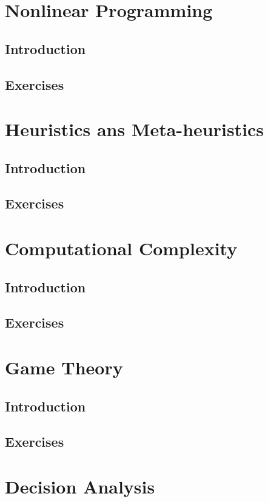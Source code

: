 \documentclass[10pt]{book}
\begin{document}
\part{Nonlinear Programming}
	\chapter{Introduction}

	\chapter{Exercises}

\part{Heuristics ans Meta-heuristics}
	\chapter{Introduction}

	\chapter{Exercises}

\part{Computational Complexity}
	\chapter{Introduction}

	\chapter{Exercises}

\part{Game Theory}
	\chapter{Introduction}

	\chapter{Exercises}

\part{Decision Analysis}
\end{document}
